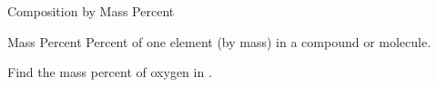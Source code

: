 \documentclass[handout]{beamer}
\begin{document}
%
%
%			
%
	
\begin{frame}[t]{Composition by Mass Percent}
	\begin{block}{Mass Percent}
		Percent of one element (by mass) in a compound or molecule.
	\end{block}

	\begin{example}
		Find the mass percent of oxygen in .
	\end{example}

\end{frame}

\end{document}
